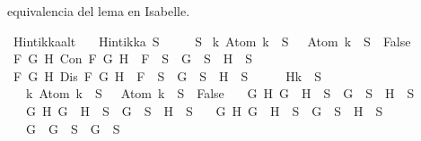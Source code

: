 \begin{isabellebody}
\begin{isamarkuptext}
  equivalencia del lema en Isabelle.%
\end{isamarkuptext}\isamarkuptrue%
\isamarkupfalse%
\ Hintikka{\isacharunderscore}alt{}{\isacharcolon}\isanewline
\ \ \ {\isachardoublequoteopen}Hintikka\ S{\isachardoublequoteclose}\isanewline
\ \ \ {\isachardoublequoteopen}{\isasymbottom}\ {\isasymnotin}\ S\isanewline
{\isasymand}\ {\isacharparenleft}{\isasymforall}k{\isachardot}\ Atom\ k\ {\isasymin}\ S\ {\isasymlongrightarrow}\ \isactrlbold {\isasymnot}\ {\isacharparenleft}Atom\ k{\isacharparenright}\ {\isasymin}\ S\ {\isasymlongrightarrow}\ False{\isacharparenright}\isanewline
{\isasymand}\ {\isacharparenleft}{\isasymforall}F\ G\ H{\isachardot}\ Con\ F\ G\ H\ {\isasymlongrightarrow}\ F\ {\isasymin}\ S\ {\isasymlongrightarrow}\ G\ {\isasymin}\ S\ {\isasymand}\ H\ {\isasymin}\ S{\isacharparenright}\isanewline
{\isasymand}\ {\isacharparenleft}{\isasymforall}F\ G\ H{\isachardot}\ Dis\ F\ G\ H\ {\isasymlongrightarrow}\ F\ {\isasymin}\ S\ {\isasymlongrightarrow}\ G\ {\isasymin}\ S\ {\isasymor}\ H\ {\isasymin}\ S{\isacharparenright}{\isachardoublequoteclose}\isanewline
%
\isadelimproof
%
\endisadelimproof
%
\isatagproof
{}\isamarkupfalse%
\ {\isacharminus}\isanewline
\ \ \isamarkupfalse%
\ Hk{\isacharcolon}{\isachardoublequoteopen}{\isacharparenleft}{\isasymbottom}\ {\isasymnotin}\ S\isanewline
\ \ {\isasymand}\ {\isacharparenleft}{\isasymforall}k{\isachardot}\ Atom\ k\ {\isasymin}\ S\ {\isasymlongrightarrow}\ \isactrlbold {\isasymnot}\ {\isacharparenleft}Atom\ k{\isacharparenright}\ {\isasymin}\ S\ {\isasymlongrightarrow}\ False{\isacharparenright}\isanewline
\ \ {\isasymand}\ {\isacharparenleft}{\isasymforall}G\ H{\isachardot}\ G\ \isactrlbold {\isasymand}\ H\ {\isasymin}\ S\ {\isasymlongrightarrow}\ G\ {\isasymin}\ S\ {\isasymand}\ H\ {\isasymin}\ S{\isacharparenright}\isanewline
\ \ {\isasymand}\ {\isacharparenleft}{\isasymforall}G\ H{\isachardot}\ G\ \isactrlbold {\isasymor}\ H\ {\isasymin}\ S\ {\isasymlongrightarrow}\ G\ {\isasymin}\ S\ {\isasymor}\ H\ {\isasymin}\ S{\isacharparenright}\isanewline
\ \ {\isasymand}\ {\isacharparenleft}{\isasymforall}G\ H{\isachardot}\ G\ \isactrlbold {\isasymrightarrow}\ H\ {\isasymin}\ S\ {\isasymlongrightarrow}\ \isactrlbold {\isasymnot}G\ {\isasymin}\ S\ {\isasymor}\ H\ {\isasymin}\ S{\isacharparenright}\isanewline
\ \ {\isasymand}\ {\isacharparenleft}{\isasymforall}G{\isachardot}\ \isactrlbold {\isasymnot}\ {\isacharparenleft}\isactrlbold {\isasymnot}G{\isacharparenright}\ {\isasymin}\ S\ {\isasymlongrightarrow}\ G\ {\isasymin}\ S{\isacharparenright}\isanewline

\end{isabellebody}
